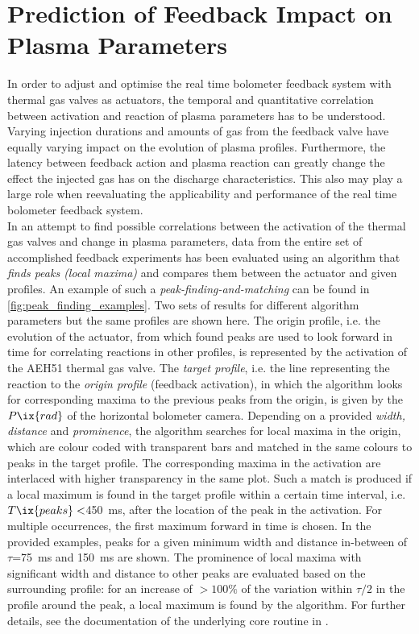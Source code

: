     \section{Prediction of Feedback Impact on Plasma Parameters}\label{sec:peaktopeak}%
%
        In order to adjust and optimise the real time bolometer feedback system with thermal gas valves as actuators, the temporal and quantitative correlation between activation and reaction of plasma parameters has to be understood. Varying injection durations and amounts of gas from the feedback valve have equally varying impact on the evolution of plasma profiles. Furthermore, the latency between feedback action and plasma reaction can greatly change the effect the injected gas has on the discharge characteristics. This also may play a large role when reevaluating the applicability and performance of the real time bolometer feedback system.\\%
        In an attempt to find possible correlations between the activation of the thermal gas valves and change in plasma parameters, data from the entire set of accomplished feedback experiments has been evaluated using an algorithm that \textit{finds peaks (local maxima)} and compares them between the actuator and given profiles. An example of such a \textit{peak-finding-and-matching} can be found in \cref{fig:peak_finding_examples}. Two sets of results for different algorithm parameters but the same profiles are shown here. The origin profile, i.e. the evolution of the actuator, from which found peaks are used to look forward in time for correlating reactions in other profiles, is represented by the activation of the AEH51 thermal gas valve. The \textit{target profile}, i.e. the line representing the reaction to the \textit{origin profile} (feedback activation), in which the algorithm looks for corresponding maxima to the previous peaks from the origin, is given by the $P\ix{rad}$ of the horizontal bolometer camera. Depending on a provided \textit{width, distance} and \textit{prominence}, the algorithm searches for local maxima in the origin, which are colour coded with transparent bars and matched in the same colours to peaks in the target profile. The corresponding maxima in the activation are interlaced with higher transparency in the same plot. Such a match is produced if a local maximum is found in the target profile within a certain time interval, i.e. $T\ix{peaks}<$\SI{450}{\milli\second}, after the location of the peak in the activation. For multiple occurrences, the first maximum forward in time is chosen. In the provided examples, peaks for a given minimum width and distance in-between of $\tau$=\SI{75}{\milli\second} and \SI{150}{\milli\second} are shown. The prominence of local maxima with significant width and distance to other peaks are evaluated based on the surrounding profile: for an increase of $>100\%$ of the variation within $\tau/2$ in the profile around the peak, a local maximum is found by the algorithm. For further details, see the documentation of the underlying core routine in \cite{ScipyFindPeaks}.\\%
